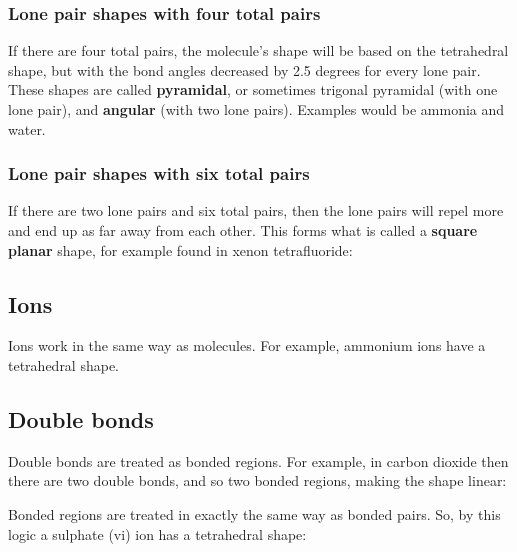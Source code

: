 \subsubsection{Lone pair shapes with four total pairs}
If there are four total pairs, the molecule's shape will be based on the tetrahedral shape, but with the bond angles decreased by 2.5 degrees for every lone pair. These shapes are called \textbf{pyramidal}, or sometimes trigonal pyramidal (with one lone pair), and \textbf{angular} (with two lone pairs). Examples would be ammonia and water.

\begin{center}
\end{center}
\begin{center}
\end{center}

\subsubsection{Lone pair shapes with six total pairs}
If there are two lone pairs and six total pairs, then the lone pairs will repel more and end up as far away from each other. This forms what is called a \textbf{square planar} shape, for example found in xenon tetrafluoride:

\begin{center}
\end{center}

\subsection{Ions}
Ions work in the same way as molecules. For example, ammonium ions have a tetrahedral shape.

\subsection{Double bonds}
Double bonds are treated as bonded regions. For example, in carbon dioxide then there are two double bonds, and so two bonded regions, making the shape linear:

\begin{center}
\end{center}

Bonded regions are treated in exactly the same way as bonded pairs. So, by this logic a sulphate (vi) ion has a tetrahedral shape:

\begin{center}
\end{center}
